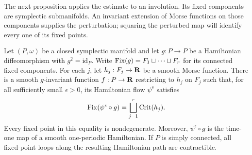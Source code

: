 The next proposition applies the estimate to an involution.  Its
fixed components are symplectic submanifolds.  An invariant extension
of Morse functions on those components supplies the perturbation;
squaring the perturbed map will identify every one of its fixed points.

\begin{proposition}
\label{dyn:involution}
Let $(P,\omega)$ be a closed symplectic manifold and let $g:P\to P$
be a Hamiltonian diffeomorphism with $g^2=\mathrm{id}_P$.  Write
$\operatorname{Fix}(g)=F_1\sqcup\cdots\sqcup F_r$ for its connected fixed
components.  For each $j$, let $h_j:F_j\to\mathbf R$ be a smooth Morse
function.  There is a smooth $g$-invariant function $f:P\to\mathbf R$
restricting to $h_j$ on $F_j$ such that, for all sufficiently small
$\epsilon>0$, its Hamiltonian flow $\psi^s$ satisfies
\begin{equation}
\label{dyn:fixed-set}
  \operatorname{Fix}(\psi^\epsilon\circ g)
    =\bigsqcup_{j=1}^r\operatorname{Crit}(h_j).
\end{equation}
Every fixed point in this equality is nondegenerate.  Moreover,
$\psi^\epsilon\circ g$ is the time-one map of a smooth one-periodic
Hamiltonian.  If $P$ is simply connected, all fixed-point loops along
the resulting Hamiltonian path are contractible.
\end{proposition}

